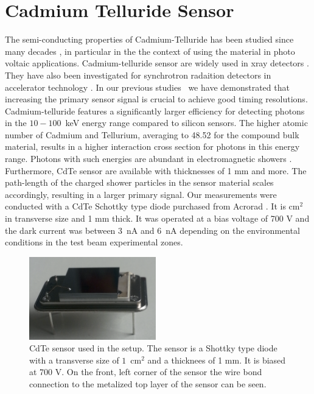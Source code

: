 %
%
%
\section{Cadmium Telluride Sensor}
\label{sec:siliconpad}
The semi-conducting properties of Cadmium-Telluride has been studied since many decades \cite{cdtegeneric}, 
in particular in the the context of using the material in photo voltaic applications.
Cadmium-telluride sensor are widely used in xray detectors \cite{cdtesensorsgeneric,cdtesensors1,cdtesensors2,cdtesensors3}. 
They have also been investigated for synchrotron radaition detectors in accelerator technology \cite{cdtelhc}.   
In our previous 
studies~\cite{Anderson:2015gha,MCPShowerMaxPaper,Ronzhin201552,SiliconTiming,PixelatedMCP,Anderson:2016ygg,Anderson:2015tia} 
we have demonstrated that increasing the primary sensor signal is crucial to achieve good timing resolutions.  
Cadmium-telluride features a significantly larger efficiency for detecting photons in the $10-100$~keV energy range 
compared to silicon sensors. The higher atomic number of Cadmium and Tellurium, averaging to 48.52 for the compound bulk material, results in a higher interaction cross section for photons in this energy range. 
Photons with such energies are abundant in electromagnetic showers \cite{showercomposition}. 
Furthermore, CdTe sensor are available with thicknesses of 1 mm and more. 
The path-length of the charged shower particles in the sensor material scales accordingly, 
resulting in a larger primary signal.
%
Our measurements were conducted with a CdTe Schottky type diode purchased from Acrorad \cite{acrorad}. 
It is $\mathrm{cm}^{2}$ in transverse size and 1 mm thick.
It was operated at a bias voltage of 700 V and the dark current was between $3$~nA 
and $6$~nA depending on the environmental conditions in the test beam experimental 
zones.     
%
\begin{figure}[htbp] 
\centering
\includegraphics[width=0.49\textwidth]{figures/CdTeSensor.png} 
\caption{CdTe sensor used in the setup. The sensor is a Shottky type diode with a transverse size 
of $1$~$\mathrm{cm}^{2}$ and a thicknees of 1 mm. It is biased at 700 V. 
On the front, left corner of the sensor the wire bond connection 
to the metalized top layer of the sensor can be seen.} 
\label{fig:CdTeSensor} 
\end{figure} 
